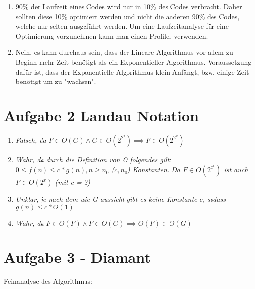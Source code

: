 \begin{enumerate}
	\item %
	90\% der Laufzeit eines Codes wird nur in 10\% des Codes verbracht. Daher sollten diese 10\% optimiert werden und nicht die anderen 90\% des Codes, welche nur selten ausgeführt werden. Um eine Laufzeitanalyse für eine Optimierung vorzunehmen kann man einen Profiler verwenden.
	
	\item %
	Nein, es kann durchaus sein, dass der Lineare-Algorithmus vor allem zu Beginn mehr Zeit benötigt als ein Exponentieller-Algorithmus. Voraussetzung dafür ist, dass der Exponentielle-Algorithmus klein Anfängt, bzw. einige Zeit benötigt um zu "wachsen".
\end{enumerate}

\section*{Aufgabe 2  Landau Notation}
\begin{enumerate}
	\item
	\textit{Falsch, da $F \in O(G) \land G \in O(2^{2^x}) \implies F \in O(2^{2^x})$}
	\item
	\textit{Wahr, da durch die Definition von O folgendes gilt: $0 \leq f(n) \leq c*g(n), n\geq n_0$ ($c, n_0$) Konstanten. Da $F \in O(2^{2^x})$ ist auch $F \in O(2^x)$ (mit c = 2)}
	\item
	\textit{Unklar, je nach dem wie G aussieht gibt es keine Konstante $c$, sodass $g(n) \leq c * O(1)$}
	\item
	\textit{Wahr, da $F \in O(F) \land F \in O(G) \implies O(F) \subset O(G) $}
\end{enumerate}

\section*{Aufgabe 3 - Diamant}


Feinanalyse des Algorithmus:

